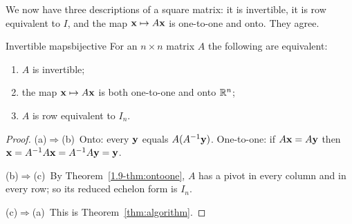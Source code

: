 \documentclass[11pt]{article}
\begin{document}
We now have three descriptions of a square matrix: it is invertible, it is row equivalent to $I$, and the map $\mathbf{x}\mapsto A\mathbf{x}$ is one-to-one and onto. They agree.

\begin{thm}{Invertible maps}{bijective}
For an $n\times n$ matrix $A$ the following are equivalent:
\begin{enumerate}[label=(\alph*),itemsep=1pt]
  \item $A$ is invertible;
  \item the map $\mathbf{x}\mapsto A\mathbf{x}$ is both one-to-one and onto $\mathbb{R}^n$;
  \item $A$ is row equivalent to $I_n$.
\end{enumerate}
\end{thm}

\begin{proof}
(a)$\Rightarrow$(b)~Onto: every $\mathbf{y}$ equals $A(A^{-1}\mathbf{y})$. One-to-one: if $A\mathbf{x}=A\mathbf{y}$ then $\mathbf{x}=A^{-1}A\mathbf{x}=A^{-1}A\mathbf{y}=\mathbf{y}$.

(b)$\Rightarrow$(c)~By Theorem~\ref{1.9-thm:ontoone}, $A$ has a pivot in every column and in every row; so its reduced echelon form is $I_n$.

(c)$\Rightarrow$(a)~This is Theorem~\ref{thm:algorithm}.
\end{proof}
\end{document}
